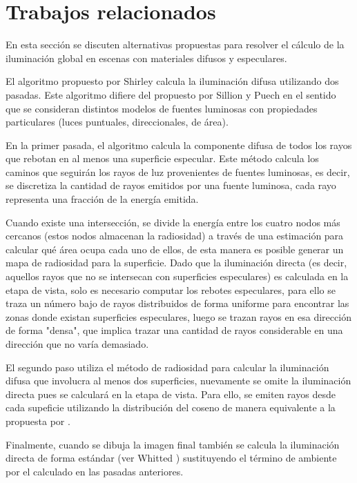 \section{Trabajos relacionados}

En esta sección se discuten alternativas propuestas para resolver el cálculo de la iluminación global en escenas con materiales difusos y especulares.

El algoritmo propuesto por Shirley \cite{Shirley} calcula la iluminación difusa utilizando dos pasadas. Este algoritmo difiere del propuesto por Sillion y Puech \cite{Sillion} en el sentido que se consideran distintos modelos de fuentes luminosas con propiedades particulares (luces puntuales, direccionales, de área).

En la primer pasada, el algoritmo calcula la componente difusa de todos los rayos que rebotan en al menos una superficie especular. Este método calcula los caminos que seguirán los rayos de luz provenientes de fuentes luminosas, es decir, se discretiza la cantidad de rayos emitidos por una fuente luminosa, cada rayo representa una fracción de la energía emitida.

Cuando existe una intersección, se divide la energía entre los cuatro nodos más cercanos (estos nodos almacenan la radiosidad) a través de una estimación para calcular qué área ocupa cada uno de ellos, de esta manera es posible generar un mapa de radiosidad para la superficie. Dado que la iluminación directa (es decir, aquellos rayos que no se intersecan con superficies especulares) es calculada en la etapa de vista, solo es necesario computar los rebotes especulares, para ello se traza un número bajo de rayos distribuidos de forma uniforme para encontrar las zonas donde existan superficies especulares, luego se trazan rayos en esa dirección de forma "densa", que implica trazar una cantidad de rayos considerable en una dirección que no varía demasiado.

El segundo paso utiliza el método de radiosidad para calcular la iluminación difusa que involucra al menos dos superficies, nuevamente se omite la iluminación directa pues se calculará en la etapa de vista. Para ello, se emiten rayos desde cada supeficie utilizando la distribución del coseno de manera equivalente a la propuesta por \citeauthor{Malley}. 

Finalmente, cuando se dibuja la imagen final también se calcula la iluminación directa de forma estándar (ver Whitted \cite{Whitted}) sustituyendo el término de ambiente por el calculado en las pasadas anteriores.


